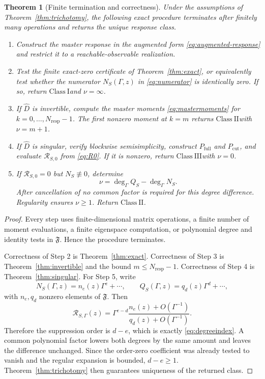 \documentclass[11pt]{article}
\newtheorem{theorem}{Theorem}[section]
\theoremstyle{definition}
\theoremstyle{remark}
\theoremstyle{plain}
\newcommand{\R}{\mathcal R}
\newcommand{\full}{\mathrm{full}}
\newcommand{\cut}{\mathrm{cut}}
\newcommand{\resp}{\mathrm{resp}}
\newcommand{\ClassI}{\ensuremath{\mathrm{Class\ I}}}
\newcommand{\ClassII}{\ensuremath{\mathrm{Class\ II}}}
\newcommand{\ClassIII}{\ensuremath{\mathrm{Class\ III}}}
\begin{document}
\begin{theorem}[Finite termination and correctness]\label{thm:algorithm}
Under the assumptions of Theorem~\ref{thm:trichotomy}, the following exact procedure terminates after finitely many operations and returns the unique response class.

\begin{enumerate}[label=\textbf{Step \arabic*.},leftmargin=16mm]
 \item Construct the master response in the augmented form \eqref{eq:augmented-response} and restrict it to a reachable-observable realization.
 \item Test the finite exact-zero certificate of Theorem~\ref{thm:exact}, or equivalently test whether the numerator $N_S(\Gamma,z)$ in \eqref{eq:numerator} is identically zero.  If so, return \ClassI and $\nu=\infty$.
 \item If $\widehat D$ is invertible, compute the master moments \eqref{eq:mastermoments} for $k=0,\ldots,N_{\resp}-1$.  The first nonzero moment at $k=m$ returns \ClassII with $\nu=m+1$.
 \item If $\widehat D$ is singular, verify blockwise semisimplicity, construct $P_{\full}$ and $P_{\cut}$, and evaluate $\R_{S,0}$ from \eqref{eq:R0}.  If it is nonzero, return \ClassIII with $\nu=0$.
 \item If $\R_{S,0}=0$ but $N_S\not\equiv0$, determine
 \begin{equation}\label{eq:degreeindex}
  \nu=\deg_{\Gamma}Q_S-\deg_{\Gamma}N_S.
 \end{equation}
 After cancellation of no common factor is required for this degree difference.  Regularity ensures $\nu\ge1$.  Return \ClassII.
\end{enumerate}
\end{theorem}

\begin{proof}
Every step uses finite-dimensional matrix operations, a finite number of moment evaluations, a finite eigenspace computation, or polynomial degree and identity tests in $\mathfrak F$.  Hence the procedure terminates.

Correctness of Step 2 is Theorem~\ref{thm:exact}.  Correctness of Step 3 is Theorem~\ref{thm:invertible} and the bound $m\le N_{\resp}-1$.  Correctness of Step 4 is Theorem~\ref{thm:singular}.  For Step 5, write
\[
 N_S(\Gamma,z)=n_e(z)\Gamma^e+\cdots,\qquad
 Q_S(\Gamma,z)=q_d(z)\Gamma^d+\cdots,
\]
with $n_e,q_d$ nonzero elements of $\mathfrak F$.  Then
\[
 \R_{S,\Gamma}(z)=\Gamma^{e-d}\frac{n_e(z)+O(\Gamma^{-1})}
 {q_d(z)+O(\Gamma^{-1})}.
\]
Therefore the suppression order is $d-e$, which is exactly \eqref{eq:degreeindex}.  A common polynomial factor lowers both degrees by the same amount and leaves the difference unchanged.  Since the order-zero coefficient was already tested to vanish and the regular expansion is bounded, $d-e\ge1$.  Theorem~\ref{thm:trichotomy} then guarantees uniqueness of the returned class.
\end{proof}
\end{document}
